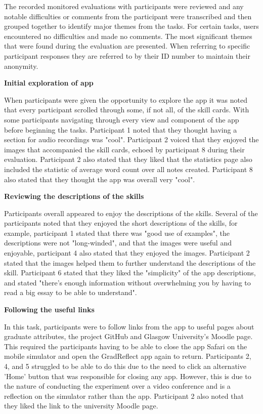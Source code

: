 \documentclass{l4proj}
\begin{document}
The recorded monitored evaluations with participants were reviewed and any notable difficulties or comments from the participant were transcribed and then grouped together to identify major themes from the tasks. For certain tasks, users encountered no difficulties and made no comments. The most significant themes that were found during the evaluation are presented. When referring to specific participant responses they are referred to by their ID number to maintain their anonymity.

\textbf{Initial exploration of app}

When participants were given the opportunity to explore the app it was noted that every participant scrolled through some, if not all, of the skill cards. With some participants navigating through every view and component of the app before beginning the tasks. Participant 1 noted that they thought having a section for audio recordings was "cool". Participant 2 voiced that they enjoyed the images that accompanied the skill cards, echoed by participant 8 during their evaluation. Participant 2 also stated that they liked that the statistics page also included the statistic of average word count over all notes created. Participant 8 also stated that they thought the app was overall very "cool".

\textbf{Reviewing the descriptions of the skills}

Participants overall appeared to enjoy the descriptions of the skills. Several of the participants noted that they enjoyed the short descriptions of the skills, for example, participant 1 stated that there was "good use of examples", the descriptions were not "long-winded", and that the images were useful and enjoyable, participant 4 also stated that they enjoyed the images. Participant 2 stated that the images helped them to further understand the descriptions of the skill. Participant 6 stated that they liked the "simplicity" of the app descriptions, and stated "there's enough information without overwhelming you by having to read a big essay to be able to understand".

\textbf{Following the useful links}

In this task, participants were to follow links from the app to useful pages about graduate attributes, the project GitHub and Glasgow University's Moodle page. This required the participants having to be able to close the app Safari on the mobile simulator and open the GradReflect app again to return. Participants 2, 4, and 5 struggled to be able to do this due to the need to click an alternative 'Home' button that was responsible for closing any app. However, this is due to the nature of conducting the experiment over a video conference and is a reflection on the simulator rather than the app. Participant 2 also noted that they liked the link to the university Moodle page.
\end{document}
